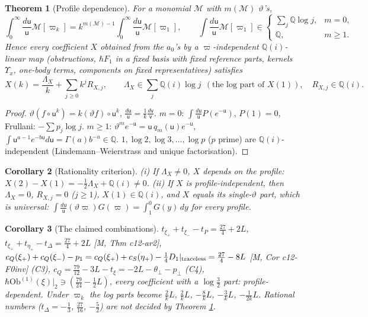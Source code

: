\documentclass[10pt]{article}
\newtheorem{theorem}{Theorem}[section]
\newtheorem{corollary}[theorem]{Corollary}
\theoremstyle{definition}
\newcommand{\Ob}{\mathrm{Ob}}
\newcommand{\uu}{\mathsf u}
\begin{document}
\begin{theorem}[Profile dependence]\label{thm:prof}
For a monomial $\mathcal M$ with $m(\mathcal M)$ $\vartheta$'s,
\[
\int_0^\infty\frac{d\uu}{\uu}\mathcal M[\varpi_k]=k^{m(\mathcal M)-1}\int_0^\infty\frac{d\uu}{\uu}\mathcal M[\varpi_1],\qquad \int\frac{d\uu}{\uu}\mathcal M[\varpi_1]\in\begin{cases}\textstyle\sum_j\mathbb Q\log j,&m=0,\\ \mathbb Q,&m\ge1.\end{cases}
\]
Hence every coefficient $X$ obtained from the $a_0$'s by a $\varpi$-independent $\mathbb Q(i)$-linear map (obstructions, $\hbar F_1$ in a fixed basis with fixed reference parts, kernels $\Upsilon_x$, one-body terms, components on fixed representatives) satisfies
\[
X(k)=\frac{\Lambda_X}k+\sum_{j\ge0}k^jR_{X,j},\qquad \Lambda_X\in\textstyle\sum_j\mathbb Q(i)\log j\ \ (\text{the log part of }X(1)),\quad R_{X,j}\in\mathbb Q(i).
\]
\end{theorem}
\begin{proof}
$\vartheta(f\circ\uu^k)=k(\vartheta f)\circ\uu^k$, $\frac{d\uu}{\uu}=\frac1k\frac{d\mathsf v}{\mathsf v}$. $m=0$: $\int\frac{d\uu}{\uu}P(e^{-\uu})$, $P(1)=0$, Frullani: $-\sum p_j\log j$. $m\ge1$: $\vartheta^me^{-\uu}=\uu\,q_m(\uu)e^{-\uu}$, $\int\uu^{a-1}e^{-b\uu}d\uu=\Gamma(a)b^{-a}\in\mathbb Q$. $1,\log2,\log3,\dots,\log p$ ($p$ prime) are $\mathbb Q(i)$-independent (Lindemann--Weierstrass and unique factorisation).
\end{proof}

\begin{corollary}[Rationality criterion]\label{cor:rat}
(i) If $\Lambda_X\ne0$, $X$ depends on the profile: $X(2)-X(1)=-\tfrac12\Lambda_X+\mathbb Q(i)\ne0$. (ii) If $X$ is profile-independent, then $\Lambda_X=0$, $R_{X,j}=0$ ($j\ge1$), $X(1)\in\mathbb Q(i)$, and $X$ equals its single-$\vartheta$ part, which is universal: $\int\frac{d\uu}{\uu}(\vartheta\varpi)G(\varpi)=\int_1^0G(y)\,dy$ for every profile.
\end{corollary}

\begin{corollary}[The claimed combinations]\label{cor:claims}
$t_{\xi_+}+t_{\xi_-}-t_P=\tfrac{27}4+2L$, $t_{\xi_+}+t_{\eta_+}-t_\Delta=\tfrac{27}4+2L$ [M, Thm c12-ar2], $c_Q(\xi_+)+c_Q(\xi_-)-p_1=c_Q(\xi_+)+c_S(\eta_+)-\tfrac14D_1|_{\rm traceless}=\tfrac{27}4-8L$ [M, Cor c12-F0inv] (C3), $c_Q=\tfrac{79}{12}-3L-t_\xi=-2L-\theta_\perp-p_\perp$ (C4), $\hbar\Ob^{(1)}(\xi)|_2\ni(\tfrac{79}{24}-\tfrac12L)$, every coefficient with a $\log\tfrac32$ part: profile-dependent. Under $\varpi_k$ the log parts become $\tfrac2kL$, $\tfrac2kL$, $-\tfrac8kL$, $-\tfrac3kL$, $-\tfrac1{2k}L$. Rational numbers ($t_\Delta=-\tfrac13$, $\tfrac{27}{16}$, $-\tfrac52$) are not decided by Theorem \ref{thm:prof}.
\end{corollary}
\end{document}
